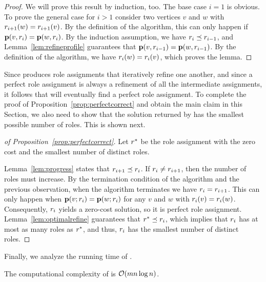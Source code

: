 \begin{proof}
We will prove this result by induction, too. 
The base case $i = 1$ is obvious.
To prove the general case for $i > 1$
consider two vertices $v$ and $w$ with $r_{i + 1}(w) = r_{i + 1}(v)$.
By the definition of the algorithm, 
this can only happen if $\prof{v, \role_i} = \prof{w, \role_i}$.
By the induction assumption,
we have $r_i \preceq r_{i - 1}$, and Lemma~\ref{lem:refineprofile}
guarantees that $\prof{v, \role_{i  - 1}} = \prof{w, \role_{i  - 1}}$. 
By the definition of the algorithm, 
we have $r_{i}(w) = r_{i}(v)$, which proves the lemma.
\end{proof}

Since  \algperfect  produces role assignments 
that iteratively refine one another,
and since a perfect role assignment 
is always a refinement of all the intermediate assignments,
it follows that \algperfect will eventually 
find a perfect role assignment. 
To complete the proof of Proposition~\ref{prop:perfectcorrect}
and obtain the main claim in this Section, 
we also need to show that the solution 
returned by \algperfect has the smallest possible number of roles.
This is shown next.

\begin{proof}[of Proposition~\ref{prop:perfectcorrect}]
Let $r^*$ be the role assignment with the zero cost and the smallest
number of distinct roles.

Lemma~\ref{lem:progress} states that $r_{i + 1} \preceq r_i$. 
If $r_i \neq r_{i + 1}$, then the number of roles must increase. 
By the termination condition of the algorithm
and the previous observation, 
when the algorithm terminates we have $r_{i} = r_{i + 1}$. 
This can only happen when
$\prof{v; \role_i} = \prof{w; \role_i}$ for any $v$ and $w$ with $r_i(v) = r_i(w)$. 
Consequently, $r_i$ yields a zero-cost solution, so it is perfect role assignment. 
Lemma~\ref{lem:optimalrefine} guarantees that $r^* \preceq r_i$, 
which implies that $r_i$ has at most as many roles as $r^*$, 
and thus, $r_i$ has the smallest number of distinct roles.
\end{proof}

Finally, we analyze the running time of \algperfect.

\begin{proposition}
The computational complexity of \algperfect is $\bigO{mn \log n}$.
\label{prop:exacttime}
\end{proposition}

